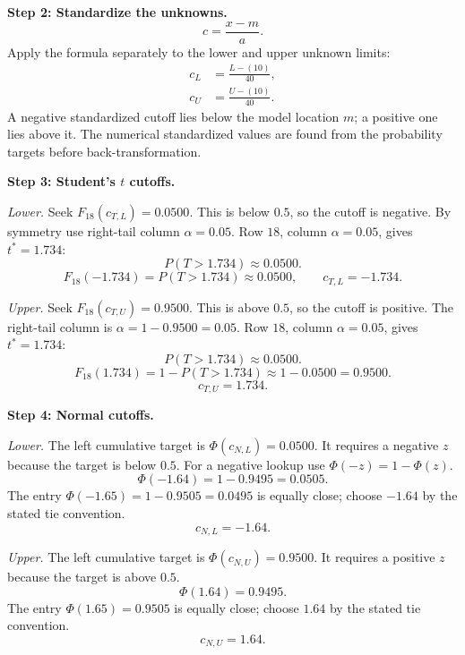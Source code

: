 \begin{enumerate}[leftmargin=*,label=\textbf{\arabic*.},itemsep=12pt,parsep=3pt,topsep=5pt]
\begin{minipage}[t]{\linewidth}
\end{minipage}\par
\par\noindent\begin{minipage}{\linewidth}
\par\textbf{Step 2: Standardize the unknowns.}\nopagebreak\enspace \[
c=\frac{x-m}{a}.
\]
Apply the formula separately to the lower and upper unknown limits:
\[
\begin{aligned}c_L&=\frac{L-(10)}{40},\\c_U&=\frac{U-(10)}{40}.\end{aligned}
\]
A negative standardized cutoff lies below the model location $m$; a positive one lies above it. The numerical standardized values are found from the probability targets before back-transformation.
\end{minipage}\par
\par\noindent\begin{minipage}{\linewidth}
\par\textbf{Step 3: Student's $t$ cutoffs.}\nopagebreak\enspace \par\textit{Lower.} Seek $F_{18}(c_{T,L})=0.0500$. This is below $0.5$, so the cutoff is negative. By symmetry use right-tail column $\alpha=0.05$. Row $18$, column $\alpha=0.05$, gives $t^*=1.734$:\[
P(T>1.734)\approx0.0500.
\]
\[
F_{18}(-1.734)=P(T>1.734)\approx0.0500,\qquad c_{T,L}=-1.734.
\]
\par\textit{Upper.} Seek $F_{18}(c_{T,U})=0.9500$. This is above $0.5$, so the cutoff is positive. The right-tail column is $\alpha=1-0.9500=0.05$. Row $18$, column $\alpha=0.05$, gives $t^*=1.734$:\[
P(T>1.734)\approx0.0500.
\]
\[
F_{18}(1.734)=1-P(T>1.734)\approx1-0.0500=0.9500.
\]
\[
c_{T,U}=1.734.
\]

\end{minipage}\par
\par\textbf{Step 4: Normal cutoffs.}\nopagebreak\enspace \par\noindent\begin{minipage}{\linewidth}
\par\textit{Lower.} The left cumulative target is $\Phi(c_{N,L})=0.0500$. It requires a negative $z$ because the target is below $0.5$. For a negative lookup use $\Phi(-z)=1-\Phi(z)$.\[
\Phi(-1.64)=1-0.9495=0.0505.
\]
The entry $\Phi(-1.65)=1-0.9505=0.0495$ is equally close; choose $-1.64$ by the stated tie convention.\[
c_{N,L}=-1.64.
\]
\end{minipage}\par
\par\noindent\begin{minipage}{\linewidth}
\par\textit{Upper.} The left cumulative target is $\Phi(c_{N,U})=0.9500$. It requires a positive $z$ because the target is above $0.5$.\[
\Phi(1.64)=0.9495.
\]
The entry $\Phi(1.65)=0.9505$ is equally close; choose $1.64$ by the stated tie convention.\[
c_{N,U}=1.64.
\]
\end{minipage}\par


\end{enumerate}
